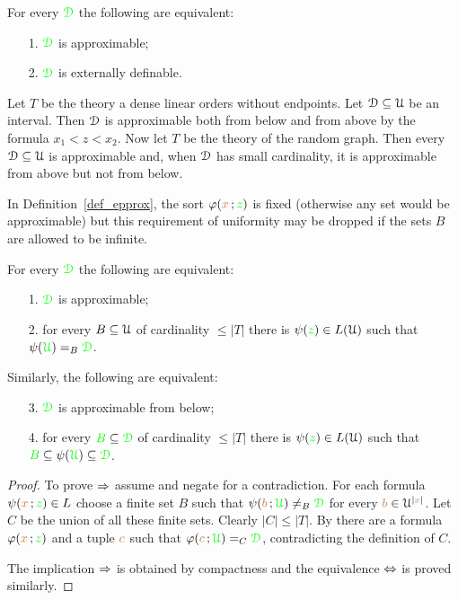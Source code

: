 \documentclass[creche.tex]{subfiles}
\begin{document}
\begin{proposition}\label{lem_approx=external}
For every ${\color{green}\EuScript D}$ the following are equivalent:
\begin{itemize}
\item[1.] ${\color{green}\EuScript D}$ is approximable;
\item[2.] ${\color{green}\EuScript D}$ is externally definable.\QED 
\end{itemize}
\end{proposition}

\begin{example}
Let $T$ be the theory a dense linear orders without endpoints. Let $\EuScript D\subseteq\EuScript U$ be an interval. Then $\EuScript D$ is approximable both from below and from above by the formula \mbox{$x_1<z<x_2$}.  Now let $T$ be the theory of the random graph. Then every $\EuScript D\subseteq\EuScript U$ is approximable and, when $\EuScript D$ has small cardinality, it is approximable from above but not from below.\QED
\end{example}

In Definition~\ref{def_epprox}, the sort $\varphi({\color{brown} x}\,;{\color{green} z})$ is fixed (otherwise any set would be approximable) but this requirement of uniformity may be dropped if the sets $B$ are allowed to be infinite.

\begin{proposition}\label{lem_approx_nonunif}
For every ${\color{green}\EuScript D}$ the following are equivalent:
\begin{itemize}
\item[1.] ${\color{green}\EuScript D}$ is approximable;
\item[2.] for every $B\subseteq\EuScript U$ of cardinality $\le|T|$ there is $\psi({\color{green} z})\in L(\EuScript U)$ such that $\psi({\color{green}\EuScript U})=_B{\color{green}\EuScript D}$.
\end{itemize}
Similarly, the following are equivalent:
\begin{itemize}
\item[3.] ${\color{green}\EuScript D}$ is approximable from below;
\item[4.]  for every ${\color{green} B}\subseteq{\color{green}\EuScript D}$ of cardinality $\le|T|$ there is $\psi({\color{green} z})\in L(\EuScript U)$ such that ${\color{green} B}\subseteq \psi({\color{green}\EuScript U})\subseteq{\color{green}\EuScript D}$.
\end{itemize}
\end{proposition}

\begin{proof}
To prove $\Rightarrow$ assume  and negate  for a contradiction. For each formula $\psi({\color{brown} x}\,;{\color{green} z})\in L$ choose a finite set $B$ such that $\psi({\color{brown} b}\,;{\color{green}\EuScript U})\neq_B{\color{green}\EuScript D}$ for every ${\color{brown} b}\in\EuScript U^{|{\color{brown} x}|}$. Let $C$ be the union of all these finite sets. Clearly $|C|\le|T|$.  By  there are a formula $\varphi({\color{brown} x}\,;{\color{green} z})$ and a tuple ${\color{brown} c}$ such that $\varphi({\color{brown} c}\,;{\color{green}\EuScript U})=_C{\color{green}\EuScript D}$, contradicting the definition of $C$.

The implication $\Rightarrow$ is obtained by compactness and the equivalence $\Leftrightarrow$ is proved similarly. 
\end{proof}
\end{document}
